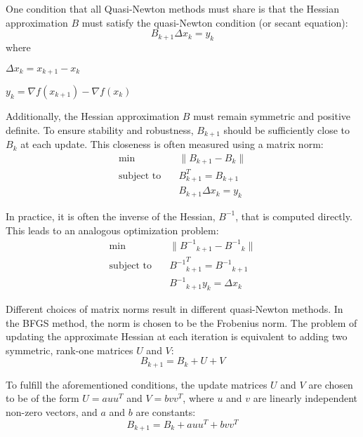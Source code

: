 \documentclass{article}
\begin{document}
One condition that all Quasi-Newton methods must share is that the Hessian approximation \( B \) must satisfy the quasi-Newton condition (or secant equation):
\begin{equation}
B_{k+1} \Delta x_k = y_k
\end{equation}
where

\hspace{0.3cm}\( \Delta x_k = x_{k+1} - x_k \) 

\hspace{0.3cm}\( y_k = \nabla f(x_{k+1}) - \nabla f(x_k) \)
\vspace{0.3cm}

Additionally, the Hessian approximation \( B \) must remain symmetric and positive definite. To ensure stability and robustness, \( B_{k+1} \) should be sufficiently close to \( B_k \) at each update. This closeness is often measured using a matrix norm:
\begin{align}
\min &\| B_{k+1} - B_k \| \\
\text{subject to} \quad &B_{k+1}^T = B_{k+1} \\
&B_{k+1} \Delta x_k = y_k
\end{align}


In practice, it is often the inverse of the Hessian, \( B^{-1} \), that is computed directly. This leads to an analogous optimization problem:
\begin{align}
\min &\| {B^{-1}}_{k+1} - {B^{-1}}_k \| \\
\text{subject to} \quad &{B^{-1}}_{k+1}^T = {B^{-1}}_{k+1} \\
&{B^{-1}}_{k+1} y_k = \Delta x_k
\end{align}



Different choices of matrix norms result in different quasi-Newton methods. In the BFGS method, the norm is chosen to be the Frobenius norm. The problem of updating the approximate Hessian at each iteration is equivalent to adding two symmetric, rank-one matrices \( U \) and \( V \):
\begin{equation}
B_{k+1} = B_k + U + V
\end{equation}

To fulfill the aforementioned conditions, the update matrices \( U \) and \( V \) are chosen to be of the form \( U = a uu^T \) and \( V = b vv^T \), where \( u \) and \( v \) are linearly independent non-zero vectors, and \( a \) and \( b \) are constants:
\begin{equation}
B_{k+1} = B_k + auu^T + bvv^T
\end{equation}
\end{document}
